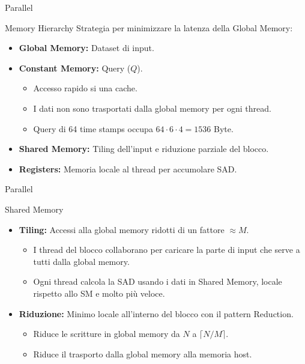 \begin{frame}{Parallel}
    \begin{block}{Memory Hierarchy}
        Strategia per minimizzare la latenza della Global Memory:
        \begin{itemize}
            \item \textbf{Global Memory:} Dataset di input.
            \item \textbf{Constant Memory:} Query ($Q$).
                \begin{itemize}
                    \item Accesso rapido si una cache.
                    \item I dati non sono trasportati dalla global memory per ogni thread.
                    \item Query di 64 time stamps occupa $64\cdot 6\cdot 4 = 1536$ Byte.
                \end{itemize}
            \item \textbf{Shared Memory:} Tiling dell'input e riduzione parziale del blocco.
            \item \textbf{Registers:} Memoria locale al thread per accumolare SAD.
        \end{itemize}
    \end{block}
\end{frame}

\begin{frame}{Parallel}
    \begin{block}{Shared Memory}
        \begin{itemize}
            \item \textbf{Tiling:} Accessi alla global memory ridotti di un fattore $\approx M$.
            \begin{itemize}
                \item I thread del blocco collaborano per caricare la parte di input che serve a tutti dalla global memory.
                \item Ogni thread calcola la SAD usando i dati in Shared Memory, locale rispetto allo SM e molto più veloce.
            \end{itemize}
            \item \textbf{Riduzione:} Minimo locale all'interno del blocco con il pattern Reduction.
            \begin{itemize}
                \item Riduce le scritture in global memory da $N$ a $\lceil N/M \rceil$.
                \item Riduce il trasporto dalla global memory alla memoria host.
            \end{itemize}
        \end{itemize}
    \end{block}
\end{frame}

